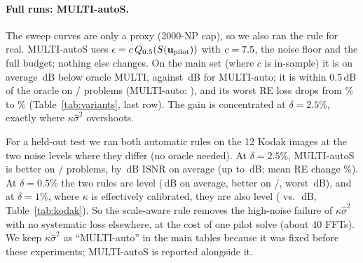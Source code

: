 
\paragraph{Full runs: MULTI-autoS.} The sweep curves are only a proxy (2000-NP cap), so we also
ran the rule for real. MULTI-autoS uses $\epsilon=c\,Q_{0.5}(S(\mathbf u_{\rm pilot}))$
with $c=7.5$, the noise floor and the full budget; nothing else changes. On the main set
(where $c$ is in-sample) it is on average \nMainAutoSLoss\,dB below oracle MULTI, against
\nMainAutoLoss\,dB for MULTI-auto; it is within 0.5\,dB of the oracle on
\nMainAutoSWithinHalf/\nMainN{} problems (MULTI-auto: \nMainAutoWithinHalf), and its worst RE
loss drops from \nMainAutoRelLossMax\% to \nMainAutoSRelLossMax\%
(Table~\ref{tab:variants}, last row). The gain is concentrated at $\delta=2.5\%$, exactly where
$\kappa\hat\sigma^2$ overshoots.

For a held-out test we ran both automatic rules on the 12 Kodak images at the two noise levels
where they differ (no oracle needed). At $\delta=2.5\%$, MULTI-autoS is better on
\nKRHiWins/\nKRHiN{} problems, by \nKRHiGain\,dB ISNR on average (up to \nKRHiBestGain\,dB;
mean RE change \nKRHiRelRE\%). At $\delta=0.5\%$ the two rules are level
(\nKRLoGain\,dB on average, better on \nKRLoWins/\nKRLoN{}, worst \nKRLoWorstGain\,dB), and at
$\delta=1\%$, where $\kappa$ is effectively calibrated, they are also level
(\nISNRKodakAutoS{} vs.\ \nISNRKodakAuto\,dB, Table~\ref{tab:kodak}). So the scale-aware rule
removes the high-noise failure of $\kappa\hat\sigma^2$ with no systematic loss elsewhere, at the cost of
one pilot solve (about 40 FFTs). We keep $\kappa\hat\sigma^2$ as ``MULTI-auto'' in the main
tables because it was fixed before these experiments; MULTI-autoS is reported alongside it.
